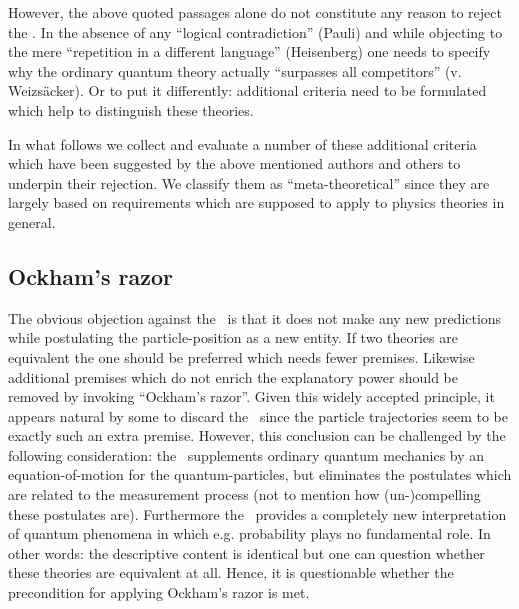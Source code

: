 However, the above quoted passages alone do not constitute any reason to reject the
\dbb. In the absence of any 
``logical contradiction'' (Pauli) and while objecting to the mere ``repetition in a 
different language''  (Heisenberg) one needs to specify why the ordinary quantum theory 
actually ``surpasses all competitors'' (v. Weizs\"acker). Or to put it differently: 
additional criteria need to be formulated which help to distinguish these theories.

In what follows we collect and evaluate a number of these additional criteria which 
have been suggested by the above mentioned authors and others to underpin their rejection. 
We classify them as ``meta-theoretical'' since they are largely based on requirements which are supposed
to apply to physics theories in general.

\subsection{Ockham's razor}
The obvious objection against the \dbb\ is that it does not make any new predictions while 
postulating the particle-position as a new entity.
If two theories are equivalent the one should be 
preferred which needs fewer premises. Likewise additional premises which do not 
enrich the explanatory power should be removed by invoking ``Ockham's razor''. 
Given this widely accepted principle, it appears natural by some to discard the \dbb\ since the 
particle trajectories seem to be exactly such an extra premise. However, this conclusion can be 
challenged by the following consideration: 
the \dbb\ supplements ordinary quantum mechanics by an equation-of-motion for the 
quantum-particles, but eliminates the postulates 
which are related to the measurement process (not to mention 
how (un-)compelling these postulates are). 
Furthermore the \dbb\ provides a completely new interpretation of quantum phenomena in 
which e.g. probability plays no fundamental role. In other words: the descriptive content
is identical but one can question whether these theories are equivalent at all.
Hence, it is questionable whether the precondition for applying Ockham's razor is met.


